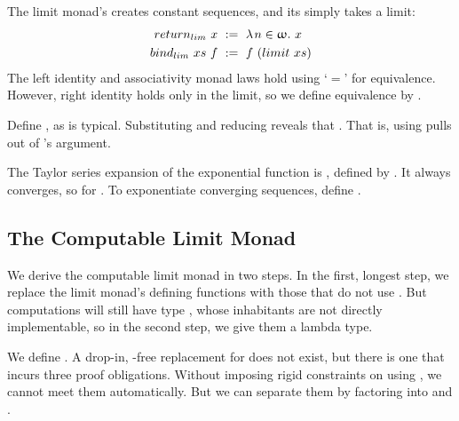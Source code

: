 The limit monad's  creates constant sequences, and its
 simply takes a limit:
\begin{equation}
\begin{aligned}
  return_{lim}~x &\ :=\ \lambda\mspace{2mu}{n \in \upomega}\ldotp\,{x} \\
  bind_{lim}~xs~f &\ :=\ f~(limit~xs)
\end{aligned}
\end{equation}
The left identity and associativity monad laws hold using `$=$' for equivalence. However, right identity holds only in the limit, so we define equivalence by .

\begin{example}[lifting]
Define , as is typical. Substituting  and reducing reveals that . That is, using  pulls  out of 's argument.
\exampleqed
\end{example}

\begin{example}[exponential]
The Taylor series expansion of the exponential function is , defined by
.
It always converges, so  for .
To exponentiate converging sequences, define .
\exampleqed
\end{example}

\subsection{The Computable Limit Monad}

We derive the computable limit monad in two steps. In the first, longest step, we replace the limit monad's defining functions with those that do not use . But computations will still have type \tlzfc{\lnat \to \metricuniv}, whose inhabitants are not directly implementable, so in the second step, we give them a lambda type.

We define . A drop-in, -free replacement for  does not exist, but there is one that incurs three proof obligations. Without imposing rigid constraints on using , we cannot meet them automatically. But we can separate them by factoring  into  and .

